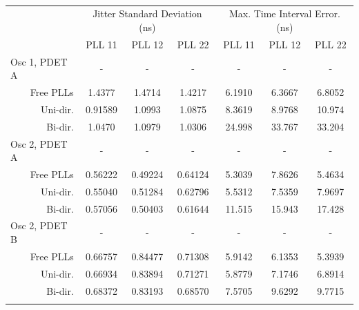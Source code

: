 \documentclass[conference]{IEEEtran}
\newcommand\T{\rule{0pt}{2.6ex}}       %
\newcommand\B{\rule[-1.2ex]{0pt}{0pt}} %
\begin{document}
\begin{table}[!ht]
    \begin{center}
        \begin{tiny}
        	\setlength{\tabcolsep}{.9\tabcolsep}
            \begin{tabular}{cc|c|c|c|c|c|c|}           
                \cline{3-8}
                && \multicolumn{3}{c|}{Jitter Standard Deviation (ns)} & \multicolumn{3}{c|}{Max. Time Interval Error. (ns)} \T\\
                \cline{3-8} 
                &&PLL 11&PLL 12&PLL 22&PLL 11&PLL 12&PLL 22\T\\
                \hline
                \multicolumn{2}{|l|}{Osc 1, PDET A}&-&-&-&-&-&-\T\\
                \multicolumn{2}{|r|}{Free PLLs} &1.4377 &1.4714&1.4217  &6.1910&6.3667&6.8052 \T\\
                \multicolumn{2}{|r|}{Uni-dir.}  &0.91589&1.0993&1.0875  &8.3619&8.9768&10.974 \T\\
                \multicolumn{2}{|r|}{Bi-dir.}   &1.0470 &1.0979&1.0306  &24.998&33.767&33.204 \T\\
                \hline
                \multicolumn{2}{|l|}{Osc 2, PDET A}&-&-&-&-&-&-\T\\
                \multicolumn{2}{|r|}{Free PLLs} &0.56222&0.49224&0.64124 &5.3039&7.8626&5.4634 \T\\
                \multicolumn{2}{|r|}{Uni-dir.}  &0.55040&0.51284&0.62796 &5.5312&7.5359&7.9697 \T\\
                \multicolumn{2}{|r|}{Bi-dir.}   &0.57056&0.50403&0.61644 &11.515&15.943&17.428 \T\\
                \hline
                \multicolumn{2}{|l|}{Osc 2, PDET B}&-&-&-&-&-&-\T\\
                \multicolumn{2}{|r|}{Free PLLs} &0.66757&0.84477&0.71308 &5.9142&6.1353&5.3939 \T\\
                \multicolumn{2}{|r|}{Uni-dir.}  &0.66934&0.83894&0.71271 &5.8779&7.1746&6.8914 \T\\
                \multicolumn{2}{|r|}{Bi-dir.}   &0.68372&0.83193&0.68570 &7.5705&9.6292&9.7715 \T\\
                \hline
                \B
                
                
            \end{tabular}
        \end{tiny}
        \caption{}
        \label{table:b_c_perf}
    \end{center}
\vspace{-0.5cm}
\end{table}
\end{document}
